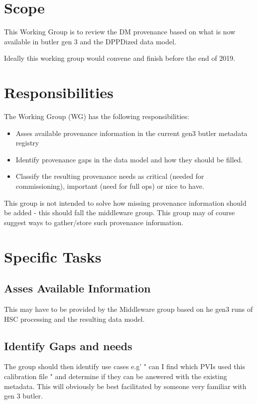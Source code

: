 
\section{Scope}

This Working Group is to review the \gls{DM} \gls{provenance} based on what is now
available in butler gen 3 and the DPPDized data model.

 Ideally this working group would convene and finish before the end of 2019.

\section{Responsibilities}

The Working Group (\gls{WG}) has the following responsibilities:

\begin{itemize}
    \item Asses available \gls{provenance} information in the current gen3 butler \gls{metadata} registry
    \item Identify \gls{provenance} gaps in the data model and how they should be filled.
    \item Classify the resulting \gls{provenance} needs as critical (needed for commissioning), important (need for full ops) or nice to have.
\end{itemize}

This group is not intended to solve how missing \gls{provenance} information should be added - this should fall the middleware group.
This group may of course suggest ways to gather/store such \gls{provenance} information.

\section{Specific Tasks}

\subsection{ Asses Available Information}

This may have to be provided by the Middleware group based on he gen3 runs of \gls{HSC} processing and the
resulting data model.

\subsection{Identify Gaps and needs}
The group should then identify use cases e.g' " can I find which PVIs used this \gls{calibration} file " and determine if they can be answered with the existing \gls{metadata}. This will obviously be best facilitated by someone very familiar with gen 3 butler.

